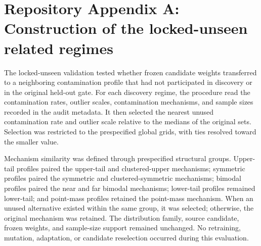 \section*{Repository Appendix A: Construction of the locked-unseen related regimes}
\label{supp:locked_unseen}

The locked-unseen validation tested whether frozen candidate weights transferred to a neighboring contamination profile that had not participated in discovery or in the original held-out gate. For each discovery regime, the procedure read the contamination rates, outlier scales, contamination mechanisms, and sample sizes recorded in the audit metadata. It then selected the nearest unused contamination rate and outlier scale relative to the medians of the original sets. Selection was restricted to the prespecified global grids, with ties resolved toward the smaller value.

Mechanism similarity was defined through prespecified structural groups. Upper-tail profiles paired the upper-tail and clustered-upper mechanisms; symmetric profiles paired the symmetric and clustered-symmetric mechanisms; bimodal profiles paired the near and far bimodal mechanisms; lower-tail profiles remained lower-tail; and point-mass profiles retained the point-mass mechanism. When an unused alternative existed within the same group, it was selected; otherwise, the original mechanism was retained. The distribution family, source candidate, frozen weights, and sample-size support remained unchanged. No retraining, mutation, adaptation, or candidate reselection occurred during this evaluation.

